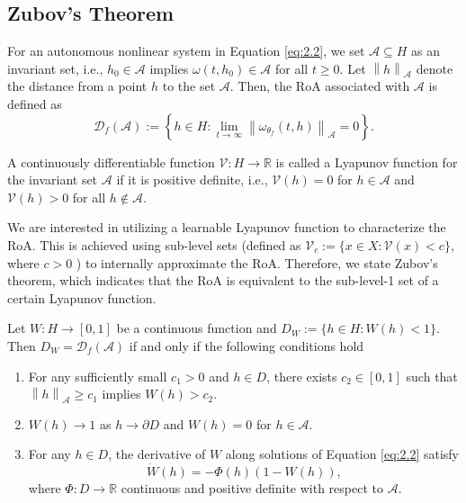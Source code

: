 \documentclass[journal]{IEEEtran}
\begin{document}
\subsection{Zubov’s Theorem}


For an autonomous nonlinear system in Equation \eqref{eq:2.2}, we set $  \mathcal{A} \subseteq H$ as an invariant set, i.e., \( h_0 \in \mathcal{A} \) implies \( \omega(t, h_0) \in \mathcal{A} \) for all \( t \geq 0 \). Let ${\left\| h \right\|_\mathcal{A}}$ denote the distance from a point $h$ to the set $\mathcal{A}$. Then, the RoA associated with $\mathcal{A}$ is defined as
\begin{equation*}
	\mathcal{D}_{f}(\mathcal{A}) := \left\{ h \in H : \lim_{t \to \infty} {\left\| {{\omega _{{\theta _f}}}(t,h)} \right\|_\mathcal{A}}= 0 \right\}.
\end{equation*}

A continuously differentiable function $\mathcal{V}: H \rightarrow \mathbb{R}$ is called a Lyapunov function for the invariant set $\mathcal{A}$ if it is positive definite, i.e., $\mathcal{V}(h) = 0$ for $h \in \mathcal{A}$ and $\mathcal{V}(h) > 0$ for all $h \notin \mathcal{A}$.

We are interested in utilizing a learnable Lyapunov function to characterize the RoA. This is achieved using sub-level sets (defined as \( \mathcal{V}_c := \{ x \in X : \mathcal{V}(x) < c \} \), where \( c > 0 \) ) to internally approximate the RoA. Therefore, we state Zubov's theorem, which indicates that the RoA is equivalent to the sub-level-1 set of a certain Lyapunov function.

\begin{lemma} \label{lem:2.2}
	Let \( W : H \rightarrow [0,1] \) be a continuous function and \( D_W:= \{ h \in H  : W(h) < 1 \} \). Then \( D_W = \mathcal{D}_{f}(\mathcal{A})\) if and only if  the following conditions hold
	\begin{enumerate}
		\item For any sufficiently small \( c_1 > 0 \) and $h \in D$, there exists \( c_2 \in[0,1] \) such that \( {\left\| h \right\|_\mathcal{A}} \geq c_1 \) implies \( W(h) > c_2 \).
		\item \( W(h) \rightarrow 1 \) as \( h \rightarrow \partial D \) and \( W(h) = 0 \) for $h \in \mathcal{A}$.
		\item For any $h \in D$, the derivative of \( W \) along solutions of Equation \eqref{eq:2.2} satisfy
		\begin{equation}  \label{eq:2.4}
			\dot{W}(h) = -\Phi(h)(1 - W(h)),
		\end{equation}
		where \( \Phi : D \rightarrow \mathbb{R} \) continuous and positive definite with respect to \( \mathcal{A}\).
	\end{enumerate}
\end{lemma}
\end{document}

